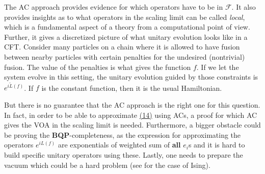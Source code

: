 \documentclass[twoside,11pt,titlepage]{amsart}
\renewcommand{\=}[1]{\stackrel{#1}{=}} %
\theoremstyle{definition}
\theoremstyle{remark}
\begin{document}
The AC approach provides evidence for which operators have to be in $\mathcal{F}$. It also provides insights as to what operators in the scaling limit can be called \textit{local}, which is a fundamental aspect of a theory from a computational point of view. Further, it gives a discretized picture of what unitary evolution looks like in a CFT. Consider many particles on a chain where it is allowed to have fusion between nearby particles with certain penalties for the undesired (nontrivial) fusion. The value of the penalties is what gives the function $f$. If we let the system evolve in this setting, the unitary evolution guided by those constraints is $e^{i\widetilde{L}(f)}$. If $f$ is the constant function, then it is the usual Hamiltonian.

But there is no guarantee that the AC approach is the right one for this question. In fact, in order to be able to approximate \hyperref[eq14]{(14)} using ACs, a proof for which AC gives the VOA in the scaling limit is needed. Furthermore, a bigger obstacle could be proving the \textbf{BQP}-completeness, as the expression for approximating the operators $e^{iL(f)}$ are exponentials of weighted sum of \textbf{all} $e_i$s and it is hard to build specific unitary operators using these. Lastly, one needs to prepare the vacuum which could be a hard problem (see \cite{murg2004adiabatic} for the case of Ising).
\end{document}
